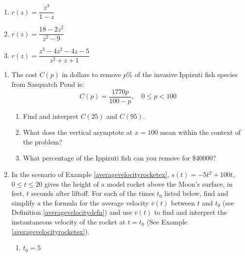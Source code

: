 \documentclass{ximera}
\begin{document}
\begin{multicols}{3}
\begin{enumerate}
\setcounter{enumi}{\value{HW}}

\item $r(z) = \dfrac{z^3}{1-z}$
\item $r(z) = \dfrac{18-2z^2}{z^2-9}$
\item $r(z) = \dfrac{z^3-4z^2-4z-5}{z^2+z+1}$ \label{alltheasymplast}


\setcounter{HW}{\value{enumi}}
\end{enumerate}
\end{multicols}

\newpage

\begin{enumerate}
\setcounter{enumi}{\value{HW}}



\item The cost $C(p)$ in dollars to remove $p$\% of the invasive  Ippizuti fish species from Sasquatch Pond is: \[C(p) = \frac{1770p}{100 - p}, \quad 0 \leq p < 100 \]

\begin{enumerate}

\item Find and interpret $C(25)$ and $C(95)$.
\item What does the vertical asymptote at $x = 100$ mean within the context of the problem?
\item What percentage of the Ippizuti fish can you remove for  \$40000?

\end{enumerate}

\item  In the scenario of  Example \ref{averagevelocityrocketex}, $s(t) = -5t^2+100t$, $0 \leq t \leq 20$ gives the height of a model rocket above the Moon's surface, in feet,  $t$ seconds after liftoff.  For each of the times $t_{0}$ listed below, find and simplify a the formula for the average velocity $\overline{v}(t)$ between $t$ and $t_{0}$ (see Definition \ref{averagevelocitydefn}) and use $\overline{v}(t)$ to find and interpret the instantaneous velocity of the rocket at $t = t_{0}$ (See Example \ref{averagevelocityrocketex}).

\begin{multicols}{4}

\begin{enumerate}

\item  $t_{0} = 5$


\end{enumerate}
\end{multicols}
\end{enumerate}
\end{document}
